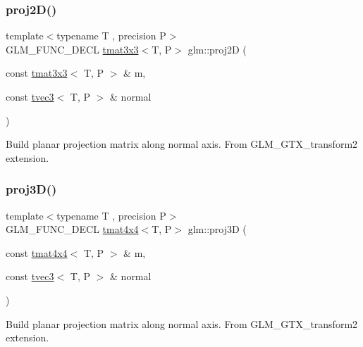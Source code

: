\subsubsection{\texorpdfstring{proj2\+D()}{proj2D()}}
{\footnotesize\ttfamily template$<$typename T , precision P$>$ \\
G\+L\+M\+\_\+\+F\+U\+N\+C\+\_\+\+D\+E\+CL \hyperlink{structglm_1_1tmat3x3}{tmat3x3}$<$T, P$>$ glm\+::proj2D (\begin{DoxyParamCaption}\item[{const \hyperlink{structglm_1_1tmat3x3}{tmat3x3}$<$ T, P $>$ \&}]{m,  }\item[{const \hyperlink{structglm_1_1tvec3}{tvec3}$<$ T, P $>$ \&}]{normal }\end{DoxyParamCaption})}

Build planar projection matrix along normal axis. From G\+L\+M\+\_\+\+G\+T\+X\+\_\+transform2 extension. \mbox{\label{group__gtx__transform2_gafab0418f2503ec2133cb2de828cc482a}} 
\subsubsection{\texorpdfstring{proj3\+D()}{proj3D()}}
{\footnotesize\ttfamily template$<$typename T , precision P$>$ \\
G\+L\+M\+\_\+\+F\+U\+N\+C\+\_\+\+D\+E\+CL \hyperlink{structglm_1_1tmat4x4}{tmat4x4}$<$T, P$>$ glm\+::proj3D (\begin{DoxyParamCaption}\item[{const \hyperlink{structglm_1_1tmat4x4}{tmat4x4}$<$ T, P $>$ \&}]{m,  }\item[{const \hyperlink{structglm_1_1tvec3}{tvec3}$<$ T, P $>$ \&}]{normal }\end{DoxyParamCaption})}

Build planar projection matrix along normal axis. From G\+L\+M\+\_\+\+G\+T\+X\+\_\+transform2 extension. \mbox{\label{group__gtx__transform2_ga2874abd228989556d610a0bff993667a}} 
